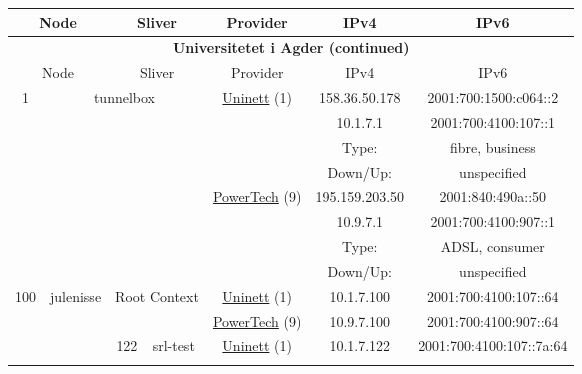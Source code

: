 \begin{small}
\begin{center}
\begin{longtable}{|c|c|c|c|c|c|c|c|}
 \multicolumn{2}{|p{8em}|}{Node} & \multicolumn{2}{|p{8em}|}{Sliver} & \multicolumn{2}{|p{8em}|}{Provider} & IPv4 & IPv6 \\ \hline
\endfirsthead
\hline
 \multicolumn{8}{|c|}{\textbf{Universitetet i Agder (continued)}} \\ \hline
 \multicolumn{2}{|p{8em}|}{Node} & \multicolumn{2}{|p{8em}|}{Sliver} & \multicolumn{2}{|p{8em}|}{Provider} & IPv4 & IPv6 \\ \hline
\endhead
 \multirow{8}{*}{\tiny{1}} & \multicolumn{3}{|c|}{\multirow{8}{*}{\tiny{tunnelbox}}} & \multicolumn{2}{|c|}{\multirow{4}{*}{\tiny{\href{https://www.uninett.no}{Uninett} (1)}}} & \tiny{158.36.50.178} & \tiny{2001:700:1500:c064::2} \\* \cline{7-7}\cline{8-8}
  & \multicolumn{3}{|c|}{} & \multicolumn{2}{|c|}{} & \tiny{10.1.7.1} & \tiny{2001:700:4100:107::1} \\* \cline{7-7}\cline{8-8}
  & \multicolumn{3}{|c|}{} & \multicolumn{2}{|c|}{} & Type: & fibre, business \\* \cline{7-7}\cline{8-8}
  & \multicolumn{3}{|c|}{} & \multicolumn{2}{|c|}{} & Down/Up:  & unspecified \\* \cline{5-5}\cline{6-6}\cline{7-7}\cline{8-8}
  & \multicolumn{3}{|c|}{} & \multicolumn{2}{|c|}{\multirow{4}{*}{\tiny{\href{http://www.powertech.no}{PowerTech} (9)}}} & \tiny{195.159.203.50} & \tiny{2001:840:490a::50} \\* \cline{7-7}\cline{8-8}
  & \multicolumn{3}{|c|}{} & \multicolumn{2}{|c|}{} & \tiny{10.9.7.1} & \tiny{2001:700:4100:907::1} \\* \cline{7-7}\cline{8-8}
  & \multicolumn{3}{|c|}{} & \multicolumn{2}{|c|}{} & Type: & ADSL, consumer \\* \cline{7-7}\cline{8-8}
  & \multicolumn{3}{|c|}{} & \multicolumn{2}{|c|}{} & Down/Up:  & unspecified \\ \hline
 \multirow{24}{*}{\tiny{100}} & \multicolumn{1}{|l|}{\multirow{24}{*}{\tiny{julenisse}}} & \multicolumn{2}{|c|}{\multirow{2}{*}{\tiny{Root Context}}} & \multicolumn{2}{|c|}{\tiny{\href{https://www.uninett.no}{Uninett} (1)}} & \tiny{10.1.7.100} & \tiny{2001:700:4100:107::64} \\* \cline{5-5}\cline{6-6}\cline{7-7}\cline{8-8}
  &  & \multicolumn{2}{|c|}{} & \multicolumn{2}{|c|}{\tiny{\href{http://www.powertech.no}{PowerTech} (9)}} & \tiny{10.9.7.100} & \tiny{2001:700:4100:907::64} \\* \cline{3-3}\cline{4-4}\cline{5-5}\cline{6-6}\cline{7-7}\cline{8-8}
  &  & \multirow{2}{*}{\tiny{122}} & \multicolumn{1}{|l|}{\multirow{2}{*}{\tiny{srl-test}}} & \multicolumn{2}{|c|}{\tiny{\href{https://www.uninett.no}{Uninett} (1)}} & \tiny{10.1.7.122} & \tiny{2001:700:4100:107::7a:64} \\* \cline{5-5}\cline{6-6}\cline{7-7}\cline{8-8}

\end{longtable}
\end{center}
\end{small}
